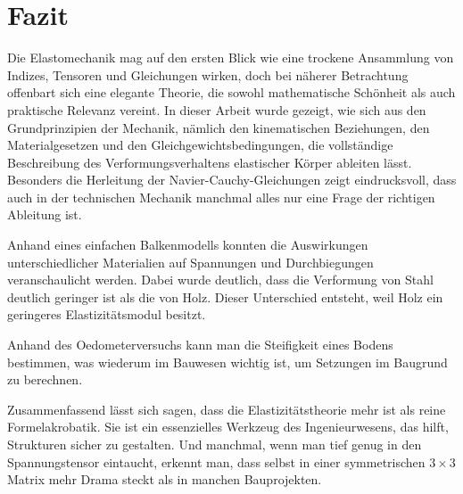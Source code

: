 %
%
%
%
\section{Fazit
\label{elastomechanik:section:teil5}}
Die Elastomechanik mag auf den ersten Blick wie eine trockene Ansammlung von Indizes, Tensoren und Gleichungen wirken, doch bei näherer Betrachtung offenbart sich eine elegante Theorie, die sowohl mathematische Schönheit als auch praktische Relevanz vereint.
In dieser Arbeit wurde gezeigt, wie sich aus den Grundprinzipien der Mechanik, nämlich den kinematischen Beziehungen, den Materialgesetzen und den Gleichgewichtsbedingungen, die vollständige Beschreibung des Verformungsverhaltens elastischer Körper ableiten lässt. 
Besonders die Herleitung der Navier-Cauchy-Gleichungen zeigt eindrucksvoll, dass auch in der technischen Mechanik manchmal alles nur eine Frage der richtigen Ableitung ist.

Anhand eines einfachen Balkenmodells konnten die Auswirkungen unterschiedlicher Materialien auf Spannungen und Durchbiegungen veranschaulicht werden. 
Dabei wurde deutlich, dass die Verformung von Stahl deutlich geringer ist als die von Holz. 
Dieser Unterschied entsteht, weil Holz ein geringeres Elastizitätsmodul besitzt.

Anhand des Oedometerversuchs kann man die Steifigkeit eines Bodens bestimmen, was wiederum im Bauwesen wichtig ist, um Setzungen im Baugrund zu berechnen.

Zusammenfassend lässt sich sagen, dass die Elastizitätstheorie mehr ist als reine Formelakrobatik. 
Sie ist ein essenzielles Werkzeug des Ingenieurwesens, das hilft, Strukturen sicher zu gestalten. 
Und manchmal, wenn man tief genug in den Spannungstensor eintaucht, erkennt man, dass selbst in einer symmetrischen $3 \times 3$ Matrix mehr Drama steckt als in manchen Bauprojekten.


